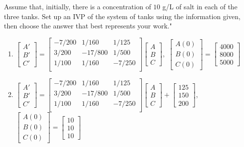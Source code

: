 \documentclass[11pt]{article}
\begin{document}
\begin{enumerate}
			Assume that, initially, there is a concentration of $10$ g/L of salt in each of the three tanks. Set up an IVP of the system of tanks using the information given, then choose the answer that best represents your work."
				\begin{enumerate}
					\item \(\begin{bmatrix}
							A' \\ B' \\ C'
						 \end{bmatrix}=\begin{bmatrix}
										-7/200 & 1/160 & 1/125 \\
										3/200 & -17/800 & 1/500 \\
										1/100 & 1/160 & -7/250 \\
						 			\end{bmatrix}												\begin{bmatrix}
										A \\ B \\ C
									\end{bmatrix}\),\											\(\begin{bmatrix}
										A(0) \\ B(0) \\ C(0)
									\end{bmatrix}=												\begin{bmatrix}
										4000 \\ 8000 \\ 5000
									\end{bmatrix}\)			
					\item \(\begin{bmatrix}
							A' \\ B' \\ C'
						 \end{bmatrix}=\begin{bmatrix}
										-7/200 & 1/160 & 1/125 \\
										3/200 & -17/800 & 1/500 \\
										1/100 & 1/160 & -7/250 \\
						 			\end{bmatrix}												\begin{bmatrix}
										A \\ B \\ C
									\end{bmatrix}+													\begin{bmatrix}
											125 \\ 150 \\ 200													\end{bmatrix}\),\ 						\(\begin{bmatrix}
										A(0) \\ B(0) \\ C(0)
									\end{bmatrix}=												\begin{bmatrix}
										10 \\ 10 \\ 10
									\end{bmatrix}\)	


\end{enumerate}
\end{enumerate}
\end{document}
